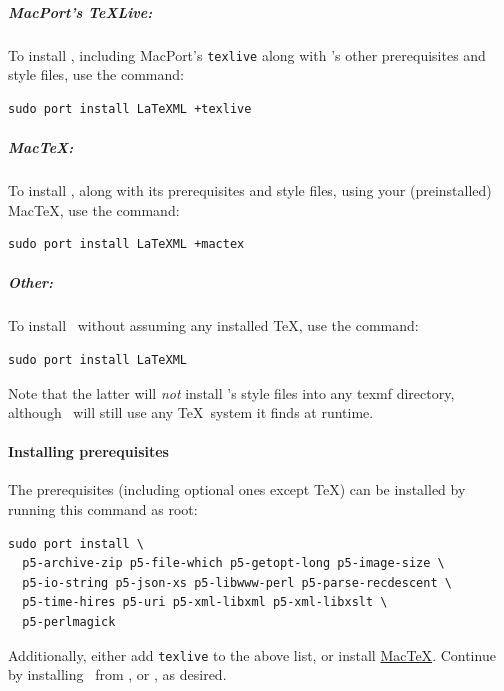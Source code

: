 \documentclass{article}
\begin{document}
\subparagraph{MacPort's TeXLive:}  To install \LaTeXML, including MacPort's \texttt{texlive}
along with \LaTeXML's other prerequisites and style files, use the command:
\begin{lstlisting}[style=shell]
sudo port install LaTeXML +texlive
\end{lstlisting}

\subparagraph{MacTeX:}  To install \LaTeXML, along with its prerequisites and style files,
using your (preinstalled) MacTeX, use the command:
\begin{lstlisting}[style=shell]
sudo port install LaTeXML +mactex
\end{lstlisting}

\subparagraph{Other:} To install \LaTeXML\ without assuming any installed \TeX,
use the command:
\begin{lstlisting}[style=shell]
sudo port install LaTeXML
\end{lstlisting}
Note that the latter will \emph{not} install \LaTeXML's style files into any texmf directory,
although \LaTeXML\ will still use any \TeX\ system it finds at runtime.

\paragraph{Installing prerequisites}\label{install.mac.prereq}
The prerequisites (including optional ones except \TeX) can be installed by running
this command as root: 
\begin{lstlisting}[style=shell]
sudo port install \
  p5-archive-zip p5-file-which p5-getopt-long p5-image-size \
  p5-io-string p5-json-xs p5-libwww-perl p5-parse-recdescent \
  p5-time-hires p5-uri p5-xml-libxml p5-xml-libxslt \
  p5-perlmagick
\end{lstlisting}
Additionally, either add \texttt{texlive} to the above list,
or install \href{http://tug.org/mactex/}{MacTeX}.
Continue by installing \LaTeXML\ from
, 
or \htmlref{GitHub}{install.github}, as desired.

\end{document}
